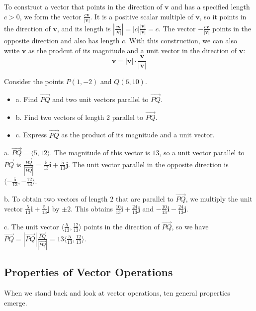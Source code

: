 \documentclass[../calc3.tex]{subfiles}
\begin{document}
To construct a vector that points in the direction of $\textbf{v}$ and has a specified length $c>0$, we form the vector $\frac{c\textbf{v}}{|\textbf{v}|}$. It is a positive scalar multiple of $\textbf{v}$, so it points in the direction of $\textbf{v}$, and its length is 
$\left| \frac{c\textbf{v}}{|\textbf{v}|}\right|=|c|\frac{|\textbf{v}|}{|\textbf{v}|}=c$. The vector $-\frac{c\textbf{v}}{|\textbf{v}|}$ points in the opposite direction and also has length $c$. With this construction, we can also write $\textbf{v}$ as the prodcut of its magnitude and a unit vector in the direction of $\textbf{v}$:
\[ \textbf{v}=|\textbf{v}|\cdot \frac{\textbf{v}}{|\textbf{v}|} \]

\begin{example}
    Consider the points $P(1,-2)$ and $Q(6,10)$.
    \begin{itemize}
        \item a. Find $\vec{PQ}$ and two unit vectors parallel to $\vec{PQ}$.
        \item b. Find two vectors of length 2 parallel to $\vec{PQ}$.
        \item c. Express $\vec{PQ}$ as the product of its magnitude and a unit vector.
    \end{itemize}

    a. $\vec{PQ} = \langle 5,12\rangle$. The magnitude of this vector is $13$, so a unit vector parallel to $\vec{PQ}$ is $\frac{\vec{PQ}}{|\vec{PQ}|}=\frac{5}{13}\textbf{i}+\frac{5}{13}\textbf{j}$.
    The unit vector parallel in the opposite direction is $\langle -\frac{5}{13},-\frac{12}{13}\rangle$.

    b. To obtain two vectors of length $2$ that are parallel to $\vec{PQ}$, we multiply the unit vector $\frac{5}{13}\textbf{i}+\frac{5}{13}\textbf{j}$ by $\pm 2$.
    This obtains $\frac{10}{13}\textbf{i}+\frac{24}{13}\textbf{j}$ and $-\frac{10}{13}\textbf{i}-\frac{24}{13}\textbf{j}$.

    c. The unit vector $\langle \frac{5}{13},\frac{12}{13}\rangle$ points in the direction of $\vec{PQ}$, so we have $\vec{PQ}=|\vec{PQ}|\frac{\vec{PQ}}{|\vec{PQ}|}=13\langle \frac{5}{13},\frac{12}{13}\rangle$.
\end{example}
\subsection*{Properties of Vector Operations}
When we stand back and look at vector operations, ten general properties emerge. 
\end{document}
